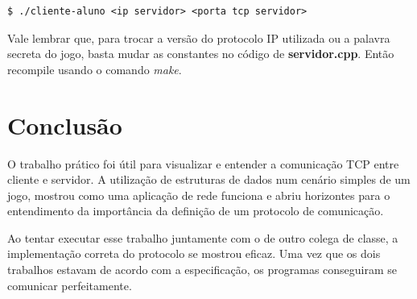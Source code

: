 \documentclass[10pt]{extarticle}
\begin{document}
\lstset{language=bash}
    \begin{lstlisting}[frame=single]
$ ./cliente-aluno <ip servidor> <porta tcp servidor>
    \end{lstlisting}

Vale lembrar que, para trocar a versão do protocolo IP utilizada ou a palavra secreta do jogo, basta mudar as constantes no código de \textbf{servidor.cpp}. Então recompile usando o comando \textit{make}.

\section{Conclusão}
O trabalho prático foi útil para visualizar e entender a comunicação TCP entre cliente e servidor. A utilização de estruturas de dados num cenário simples de um jogo, mostrou como uma aplicação de rede funciona e abriu horizontes para o entendimento da importância da definição de um protocolo de comunicação.

Ao tentar executar esse trabalho juntamente com o de outro colega de classe, a implementação correta do protocolo se mostrou eficaz. Uma vez que os dois trabalhos estavam de acordo com a especificação, os programas conseguiram se comunicar perfeitamente. 
\end{document}
